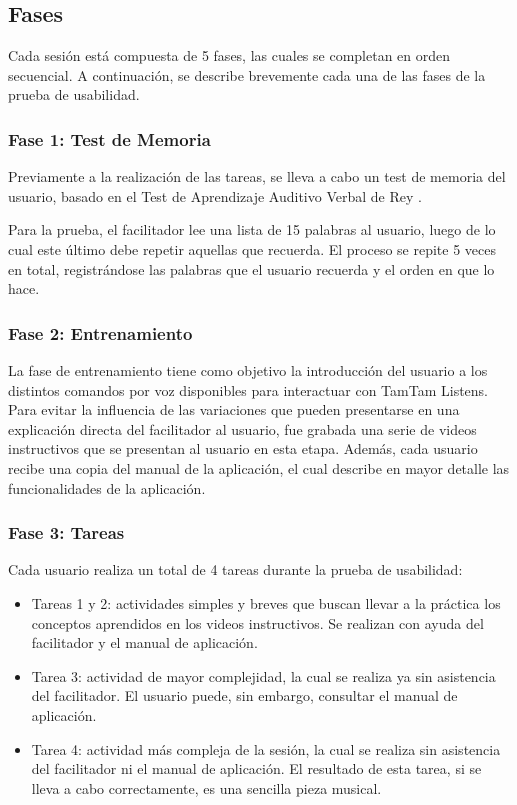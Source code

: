 \subsection{Fases}
Cada sesi\'on est\'a compuesta de 5 fases, las cuales se completan en orden secuencial.
A continuaci\'on, se describe brevemente cada una de las fases de la prueba de usabilidad.

\subsubsection{Fase 1: Test de Memoria}
Previamente a la realizaci\'on de las tareas, se lleva a cabo un test de memoria del usuario, basado en
el Test de Aprendizaje Auditivo Verbal de Rey \cite{Lopez1998}. 

Para la prueba, el facilitador lee una lista
de 15 palabras al usuario, luego de lo cual este \'ultimo debe repetir aquellas que recuerda.
El proceso se repite 5 veces en total, registr\'andose las palabras que el usuario recuerda y el orden en que
lo hace.

\subsubsection{Fase 2: Entrenamiento}
La fase de entrenamiento tiene como objetivo la introducci\'on del usuario a los distintos comandos por voz disponibles
para interactuar con TamTam Listens. 
Para evitar la influencia de las variaciones que pueden presentarse en una
explicaci\'on directa del facilitador al usuario, fue grabada una serie de videos instructivos 
que se presentan al usuario en esta etapa.
Adem\'as, cada usuario recibe una copia del manual de la aplicaci\'on, el cual describe en mayor detalle las
funcionalidades de la aplicaci\'on.

\subsubsection{Fase 3: Tareas}
Cada usuario realiza un total de 4 tareas durante la prueba de usabilidad:
	\begin{itemize}			
		\item Tareas 1 y 2: actividades simples y breves que buscan llevar a la pr\'actica los conceptos 
		aprendidos en los videos instructivos. Se realizan con ayuda del facilitador y el manual de aplicaci\'on.
		\item Tarea 3: actividad de mayor complejidad, la cual se realiza ya sin asistencia del facilitador.
		El usuario puede, sin embargo, consultar el manual de aplicaci\'on.
		\item Tarea 4: actividad m\'as compleja de la sesi\'on, la cual se realiza sin asistencia del facilitador
		ni el manual de aplicaci\'on. El resultado de esta tarea, si se lleva a cabo correctamente, es una sencilla pieza musical.
	\end{itemize}

